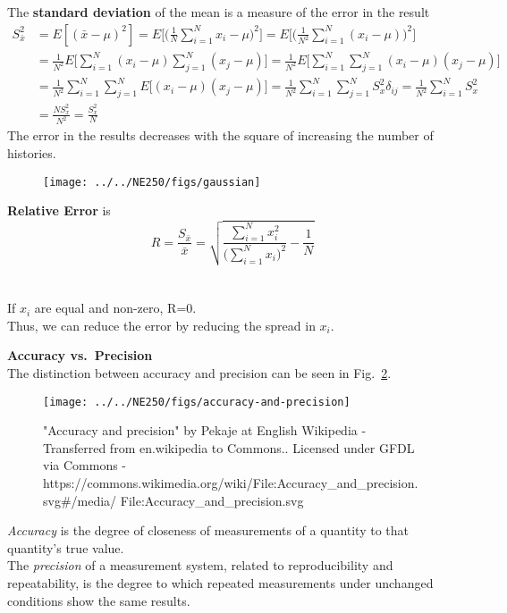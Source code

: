 \documentclass[12pt, answers]{exam}
\begin{document}
The \textbf{standard deviation} of the mean is a measure of the error in the result
\begin{align*}
S_{\bar{x}}^2 &= E[(\bar{x} - \mu)^2] = E\biggl[ \biggl(\frac{1}{N}\sum_{i=1}^N x_i - \mu\biggr)^2\biggr] = E\biggl[ \biggl(\frac{1}{N^2}\sum_{i=1}^N (x_i - \mu)\biggr)^2\biggr]\\
%
&=\frac{1}{N^2} E\biggl[ \sum_{i=1}^N (x_i - \mu) \sum_{j=1}^N (x_j - \mu)\biggr] = \frac{1}{N^2} E\biggl[ \sum_{i=1}^N \sum_{j=1}^N (x_i - \mu)  (x_j - \mu)\biggr]\\
%
&= \frac{1}{N^2} \sum_{i=1}^N \sum_{j=1}^N E\bigl[  (x_i - \mu)  (x_j - \mu)\bigr] = \frac{1}{N^2} \sum_{i=1}^N \sum_{j=1}^N S^2_x \delta_{ij} = \frac{1}{N^2} \sum_{i=1}^N S_x^2 \\
%
&= \frac{N S_x^2}{N^2} = \boxed{\frac{S_x^2}{N}}
\end{align*}
The error in the results decreases with the square of increasing the number of histories.
%
\begin{figure}[h!]
\begin{center}
  \texttt{[image: ../../NE250/figs/gaussian]}
\end{center}
  \label{fig:gaussian}
\end{figure}

\textbf{Relative Error} is 
\ifprintanswers
\[
R = \frac{S_{\bar{x}}}{\bar{x}} = \sqrt{\frac{\sum_{i=1}^N x_i^2}{\bigl(\sum_{i=1}^N x_i\bigr)^2} - \frac{1}{N}} 
\]
\else
\\ \vspace*{2em}\\
\fi
If $x_i$ are equal and non-zero, R=0.\\
Thus, we can reduce the error by reducing the spread in $x_i$.

\textbf{Accuracy vs.\ Precision}\\
The distinction between accuracy and precision can be seen in Fig.~\ref{fig:accuracy}.\\
%
\begin{figure}[h!]
\begin{center}
  \texttt{[image: ../../NE250/figs/accuracy-and-precision]}
\end{center}
  \caption{"Accuracy and precision" by Pekaje at English Wikipedia - Transferred from en.wikipedia to Commons.. Licensed under GFDL via Commons - https://commons.wikimedia.org/wiki/File:Accuracy\_and\_precision.svg\#/media/
  File:Accuracy\_and\_precision.svg}
  \label{fig:accuracy}
\end{figure}
%
\textit{Accuracy} is the degree of closeness of measurements of a quantity to that quantity's true value.\\
The \textit{precision} of a measurement system, related to reproducibility and repeatability, is the degree to which repeated measurements under unchanged conditions show the same results.
\end{document}
